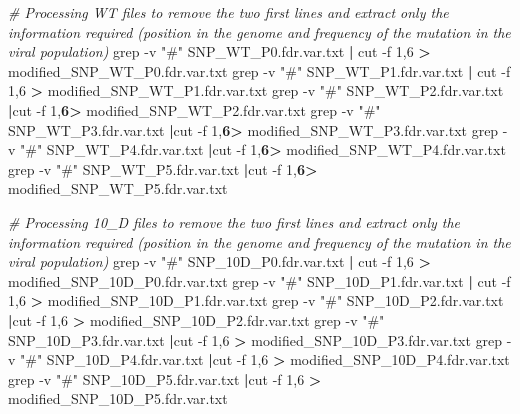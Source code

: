 \documentclass[
]{article}
\newenvironment{Shaded}{\begin{snugshade}}{\end{snugshade}}
\newcommand{\CommentTok}[1]{\textcolor[rgb]{0.56,0.35,0.01}{\textit{#1}}}
\newcommand{\FunctionTok}[1]{\textcolor[rgb]{0.00,0.00,0.00}{#1}}
\newcommand{\KeywordTok}[1]{\textcolor[rgb]{0.13,0.29,0.53}{\textbf{#1}}}
\newcommand{\NormalTok}[1]{#1}
\newcommand{\OperatorTok}[1]{\textcolor[rgb]{0.81,0.36,0.00}{\textbf{#1}}}
\newcommand{\StringTok}[1]{\textcolor[rgb]{0.31,0.60,0.02}{#1}}
\begin{document}
\begin{Shaded}
\begin{Highlighting}[]

\CommentTok{\# Processing WT files to remove the two first lines and extract only the information required (position in the genome and frequency of the mutation in the viral population)}
  \FunctionTok{grep}\NormalTok{ {-}v }\StringTok{"\#"}\NormalTok{ SNP\_WT\_P0.fdr.var.txt }\KeywordTok{|} \FunctionTok{cut}\NormalTok{ {-}f 1,6  }\OperatorTok{\textgreater{}}\NormalTok{ modified\_SNP\_WT\_P0.fdr.var.txt}
  \FunctionTok{grep}\NormalTok{ {-}v }\StringTok{"\#"}\NormalTok{ SNP\_WT\_P1.fdr.var.txt }\KeywordTok{|} \FunctionTok{cut}\NormalTok{ {-}f 1,6  }\OperatorTok{\textgreater{}}\NormalTok{ modified\_SNP\_WT\_P1.fdr.var.txt}
  \FunctionTok{grep}\NormalTok{ {-}v }\StringTok{"\#"}\NormalTok{ SNP\_WT\_P2.fdr.var.txt }\KeywordTok{|}\FunctionTok{cut}\NormalTok{ {-}f 1,}\OperatorTok{6\textgreater{}}\NormalTok{ modified\_SNP\_WT\_P2.fdr.var.txt}
  \FunctionTok{grep}\NormalTok{ {-}v }\StringTok{"\#"}\NormalTok{ SNP\_WT\_P3.fdr.var.txt }\KeywordTok{|}\FunctionTok{cut}\NormalTok{ {-}f 1,}\OperatorTok{6\textgreater{}}\NormalTok{ modified\_SNP\_WT\_P3.fdr.var.txt}
  \FunctionTok{grep}\NormalTok{ {-}v }\StringTok{"\#"}\NormalTok{ SNP\_WT\_P4.fdr.var.txt }\KeywordTok{|}\FunctionTok{cut}\NormalTok{ {-}f 1,}\OperatorTok{6\textgreater{}}\NormalTok{ modified\_SNP\_WT\_P4.fdr.var.txt}
  \FunctionTok{grep}\NormalTok{ {-}v }\StringTok{"\#"}\NormalTok{ SNP\_WT\_P5.fdr.var.txt }\KeywordTok{|}\FunctionTok{cut}\NormalTok{ {-}f 1,}\OperatorTok{6\textgreater{}}\NormalTok{ modified\_SNP\_WT\_P5.fdr.var.txt}
  
  
\CommentTok{\# Processing 10\_D files to remove the two first lines and extract only the information required (position in the genome and frequency of the mutation in the viral population)}
  \FunctionTok{grep}\NormalTok{ {-}v }\StringTok{"\#"}\NormalTok{ SNP\_10D\_P0.fdr.var.txt }\KeywordTok{|} \FunctionTok{cut}\NormalTok{ {-}f 1,6  }\OperatorTok{\textgreater{}}\NormalTok{ modified\_SNP\_10D\_P0.fdr.var.txt}
  \FunctionTok{grep}\NormalTok{ {-}v }\StringTok{"\#"}\NormalTok{ SNP\_10D\_P1.fdr.var.txt }\KeywordTok{|} \FunctionTok{cut}\NormalTok{ {-}f 1,6  }\OperatorTok{\textgreater{}}\NormalTok{ modified\_SNP\_10D\_P1.fdr.var.txt}
  \FunctionTok{grep}\NormalTok{ {-}v }\StringTok{"\#"}\NormalTok{ SNP\_10D\_P2.fdr.var.txt }\KeywordTok{|}\FunctionTok{cut}\NormalTok{ {-}f 1,6 }\OperatorTok{\textgreater{}}\NormalTok{ modified\_SNP\_10D\_P2.fdr.var.txt}
  \FunctionTok{grep}\NormalTok{ {-}v }\StringTok{"\#"}\NormalTok{ SNP\_10D\_P3.fdr.var.txt }\KeywordTok{|}\FunctionTok{cut}\NormalTok{ {-}f 1,6 }\OperatorTok{\textgreater{}}\NormalTok{ modified\_SNP\_10D\_P3.fdr.var.txt}
  \FunctionTok{grep}\NormalTok{ {-}v }\StringTok{"\#"}\NormalTok{ SNP\_10D\_P4.fdr.var.txt }\KeywordTok{|}\FunctionTok{cut}\NormalTok{ {-}f 1,6 }\OperatorTok{\textgreater{}}\NormalTok{ modified\_SNP\_10D\_P4.fdr.var.txt}
  \FunctionTok{grep}\NormalTok{ {-}v }\StringTok{"\#"}\NormalTok{ SNP\_10D\_P5.fdr.var.txt }\KeywordTok{|}\FunctionTok{cut}\NormalTok{ {-}f 1,6 }\OperatorTok{\textgreater{}}\NormalTok{ modified\_SNP\_10D\_P5.fdr.var.txt}
\end{Highlighting}
\end{Shaded}
\end{document}
